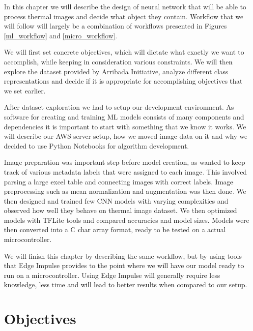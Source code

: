 In this chapter we will describe the design of neural network that will be able to process thermal images and decide what object they contain.
Workflow that we will follow will largely be a combination of workflows presented in Figures \ref{ml_workflow} and \ref{micro_workflow}.

We will first set concrete objectives, which will dictate what exactly we want to accomplish, while keeping in consideration various constraints.
We will then explore the dataset provided by Arribada Initiative, analyze different class representations and decide if it is appropriate for accomplishing objectives that we set earlier.

After dataset exploration we had to setup our development environment.
As software for creating and training ML models consists of many components and dependencies it is important to start with something that we know it works.
We will describe our AWS server setup, how we moved image data on it and why we decided to use Python Notebooks for algorithm development.

Image preparation was important step before model creation, as wanted to keep track of various metadata labels that were assigned to each image.
This involved parsing a large excel table and connecting images with correct labels.
Image preprocessing such as mean normalization and augmentation was then done.
We then designed and trained few CNN models with varying complexities and observed how well they behave on thermal image dataset.
We then optimized models with TFLite tools and compared accuracies and model sizes.
Models were then converted into a C char array format, ready to be tested on a actual microcontroller.

We will finish this chapter by describing the same workflow, but by using tools that Edge Impulse provides to the point where we will have our model ready to run on a microcontroller.
Using Edge Impulse will generally require less knowledge, less time and will lead to better results when compared to our setup.


\section{ Objectives}

